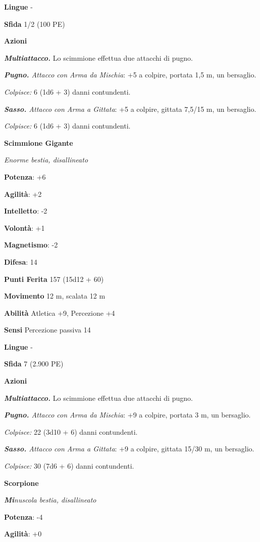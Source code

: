 \begin{multicols}{2}
\textbf{Lingue} -

\textbf{Sfida} 1/2 (100 PE)

\textbf{Azioni}

\emph{\textbf{Multiattacco.}} Lo scimmione effettua due attacchi di
pugno.

\emph{\textbf{Pugno.} Attacco con Arma da Mischia}: +5 a colpire,
portata 1,5 m, un bersaglio.

\emph{Colpisce:} 6 (1d6 + 3) danni contundenti.

\emph{\textbf{Sasso.} Attacco con Arma a Gittata}: +5 a colpire, gittata
7,5/15 m, un bersaglio.

\emph{Colpisce:} 6 (1d6 + 3) danni contundenti.

\textbf{Scimmione Gigante}

\emph{Enorme bestia, disallineato}

\textbf{Potenza}: +6

\textbf{Agilità}: +2

\textbf{Intelletto}: -2

\textbf{Volontà}: +1

\textbf{Magnetismo}: -2

\textbf{Difesa}: 14

\textbf{Punti Ferita} 157 (15d12 + 60)

\textbf{Movimento} 12 m, scalata 12 m

\textbf{Abilità} Atletica +9, Percezione +4

\textbf{Sensi} Percezione passiva 14

\textbf{Lingue} -

\textbf{Sfida} 7 (2.900 PE)

\textbf{Azioni}

\emph{\textbf{Multiattacco.}} Lo scimmione effettua due attacchi di
pugno.

\emph{\textbf{Pugno.} Attacco con Arma da Mischia}: +9 a colpire,
portata 3 m, un bersaglio.

\emph{Colpisce:} 22 (3d10 + 6) danni contundenti.

\emph{\textbf{Sasso.} Attacco con Arma a Gittata}: +9 a colpire, gittata
15/30 m, un bersaglio.

\emph{Colpisce:} 30 (7d6 + 6) danni contundenti.

\textbf{Scorpione}

\emph{\textbf{Mi}nuscola bestia, disallineato}

\textbf{Potenza}: -4

\textbf{Agilità}: +0


\end{multicols}
